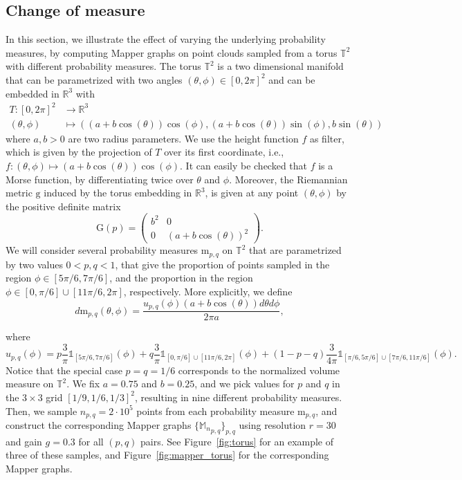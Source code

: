 \documentclass[pdflatex,sn-mathphys-ay]{sn-jnl}%
\newcommand{\mes}{\mathrm{m}}
\newcommand{\mapper}{{\mathbb{M}_n}}
\newcommand{\ind}{\mathds{1}}
\newcommand{\g}{\mathrm{g}}
\newcommand{\G}{\mathrm{G}}
\newcommand{\R}{\mathbb{R}}
\newcommand{\torus}{\mathbb{T}^2}
\newcommand{\embd}{T}
\theoremstyle{thmstyleone}%
\begin{document}
\subsection{Change of measure}
In this section,
we illustrate the effect of varying the underlying probability measures, 
by computing Mapper graphs on point clouds sampled from a torus $\torus$ with different probability measures. The torus $\torus$ is a two dimensional manifold that can be parametrized with two angles $(\theta,\phi)\in[0,2\pi]^2$ and can be embedded in $\R^3$ with
\begin{align*}
\embd\colon[0,2\pi]^2&\longrightarrow\R^3\\
(\theta,\phi)&\longmapsto((a+b\cos(\theta))\cos(\phi),(a+b\cos(\theta))\sin(\phi),b\sin(\theta))
\end{align*}
where $a,b>0$ are two radius parameters.
%
We use the height function $f$ as filter, which is given by the projection of $\embd$ over its first coordinate, i.e., $f\colon(\theta,\phi)\mapsto(a+b\cos(\theta))\cos(\phi)$. It can easily be checked that $f$ is a Morse function, by differentiating twice over $\theta$ and $\phi$.
%
Moreover, %
the Riemannian metric $\g$ induced by the torus embedding in $\R^3$, 
is given at any point $(\theta,\phi)$ by the positive definite matrix
$$\G(p)=\begin{pmatrix}
b^2 & 0 \\
0 & (a+b\cos(\theta))^2
\end{pmatrix}.$$
We will consider several probability measures $\mes_{p,q}$ on $\torus$ that are parametrized by two values $0<p,q<1$, that give the proportion of points sampled in the region $\phi\in[5\pi/6,7\pi/6]$, and the proportion in the region $\phi\in[0,\pi/6]\cup[11\pi/6,2\pi]$, respectively. More explicitly, we define
$$d\mes_{p,q}(\theta,\phi)=\frac{u_{p,q}(\phi)(a+b\cos(\theta))d\theta d\phi}{2\pi a},$$

where
$$u_{p,q}(\phi)=p\frac{3}{\pi}\ind_{[5\pi/6,7\pi/6]}(\phi)+q\frac{3}{\pi}\ind_{[0,\pi/6]\cup[11\pi/6,2\pi]}(\phi)+(1-p-q)\frac{3}{4\pi}\ind_{[\pi/6,5\pi/6]\cup[7\pi/6,11\pi/6]}(\phi).$$
Notice that the special case $p=q=1/6$ corresponds to the normalized volume measure on $\torus$.
%
We fix $a=0.75$ and $b=0.25$, and we pick values for $p$ and $q$ in the $3\times 3$ grid $[1/9,1/6,1/3]^2$, resulting in nine different probability measures. Then, we sample $n_{p,q}=2\cdot10^5$ points from each probability measure $\mes_{p,q}$, and construct the corresponding Mapper graphs $\{\mapper_{p,q}\}_{p,q}$ using resolution $r=30$ and gain $g=0.3$ for all $(p,q)$ pairs. See Figure~\ref{fig:torus} for an example of three of these samples, and Figure~\ref{fig:mapper_torus} for the corresponding Mapper graphs. %
\end{document}
